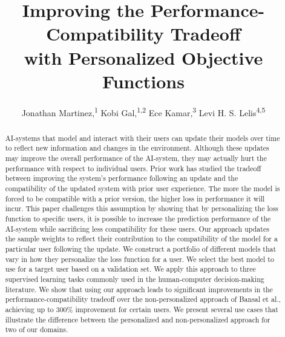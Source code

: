 \documentclass[letterpaper]{article}
\theoremstyle{definition}
\begin{document}
\title{Improving the Performance-Compatibility Tradeoff \\ with Personalized Objective Functions}

\author{
Jonathan Martinez,\textsuperscript{\rm 1}
Kobi Gal,\textsuperscript{\rm 1,2}
Ece Kamar,\textsuperscript{\rm 3}
Levi H. S. Lelis\textsuperscript{\rm 4,5}
\\
}

\maketitle


\begin{abstract}
AI-systems that model and interact with their users can update their models over time to reflect new information and changes in the environment. Although these updates may improve the overall performance of the AI-system, they may actually hurt the performance with respect to individual users. Prior work has studied the tradeoff between improving the system's performance following an update and the compatibility of the updated system with prior user experience. The more the model is forced to be compatible with a prior version, the higher loss in performance it will incur. This paper  challenges this assumption by showing  that by
personalizing the loss function to specific users, it is possible to  increase the  prediction performance of the AI-system   while sacrificing  less   compatibility for these users.   Our approach updates the  sample weights  to reflect their contribution to the compatibility of the model  for a particular user following the update. We construct a portfolio of
different models that vary in how they personalize the loss function for a user. We select  the  best model
to use  for  a  target user based on a validation set.
We apply this approach to three supervised learning tasks commonly used in the human-computer decision-making literature. We show that using our approach leads to     significant improvements in the performance-compatibility tradeoff  over the  non-personalized approach of Bansal et al., achieving up to 300\% improvement    for certain users.  We present several use cases that illustrate the difference between the personalized and
non-personalized approach for two of our domains.
\end{abstract}
\end{document}
